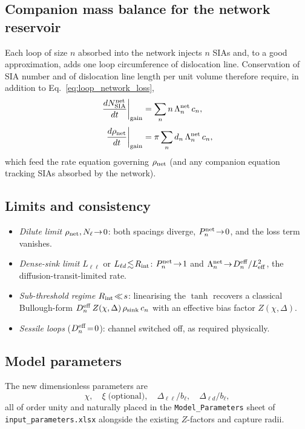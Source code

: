 \documentclass[11pt,a4paper]{article}
\begin{document}
\subsection*{Companion mass balance for the network reservoir}

Each loop of size $n$ absorbed into the network injects $n$ SIAs and,
to a good approximation, adds one loop circumference of dislocation
line.  Conservation of SIA number and of dislocation line length per
unit volume therefore require, in addition to
Eq.~\eqref{eq:loop_network_loss},
\begin{align}
  \left.\frac{dN_{\rm SIA}^{\rm net}}{dt}\right|_{\rm gain}
  &=\sum_{n}n\,\Lambda_n^{\rm net}\,c_n,
  \label{eq:N_sia_balance}\\[2pt]
  \left.\frac{d\rho_{\rm net}}{dt}\right|_{\rm gain}
  &=\pi\sum_{n}d_n\,\Lambda_n^{\rm net}\,c_n,
  \label{eq:rho_net_balance}
\end{align}
which feed the rate equation governing $\rho_{\rm net}$ (and any
companion equation tracking SIAs absorbed by the network).

\subsection*{Limits and consistency}

\begin{itemize}\itemsep1pt
  \item \emph{Dilute limit} $\rho_{\rm net},N_\ell\!\to\!0$: both
        spacings diverge, $P_n^{\rm net}\!\to\!0$, and the loss term
        vanishes.
  \item \emph{Dense-sink limit} $L_{\ell\ell}$ or
        $L_{\ell d}\!\lesssim\!R_{\rm int}$: $P_n^{\rm net}\!\to\!1$
        and $\Lambda_n^{\rm net}\!\to\!D_n^{\rm eff}/L_{\rm eff}^{2}$,
        the diffusion-transit-limited rate.
  \item \emph{Sub-threshold regime} $R_{\rm int}\!\ll\!s$: linearising
        the $\tanh$ recovers a classical Bullough-form
        $D_n^{\rm eff}\,Z(\chi,\Delta)\,\rho_{\rm sink}\,c_n$ with an
        effective bias factor $Z(\chi,\Delta)$.
  \item \emph{Sessile loops} ($D_n^{\rm eff}\!=\!0$): channel switched
        off, as required physically.
\end{itemize}

\subsection*{Model parameters}

The new dimensionless parameters are
\[
  \chi,\quad\xi\;\text{(optional)},\quad\Delta_{\ell\ell}/b_\ell,\quad\Delta_{\ell d}/b_\ell,
\]
all of order unity and naturally placed in the
\texttt{Model\_Parameters} sheet of \texttt{input\_parameters.xlsx}
alongside the existing $Z$-factors and capture radii.



\end{document}
